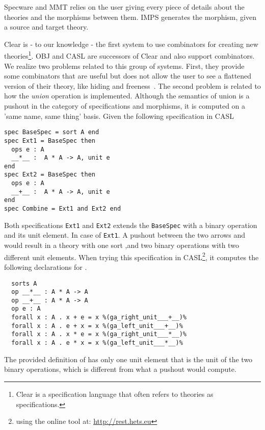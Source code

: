 
Specware and MMT relies on the user giving every piece of details about the theories and the morphisms between them. IMPS generates the morphism, given a source and target theory. 

Clear is - to our knowledge - the first system to use combinators for creating new theories\footnote{Clear is a specification language that often refers to theories as specifications.}. OBJ and CASL are successors of Clear and also support combinators. We realize two problems related to this group of systems. First, they provide some combinators that are useful but does not allow the user to see a flattened version of their theory, like hiding and freeness~\cite{CoFI:2004:CASL-RM}. The second problem is related to how the \emph{union} operation is implemented. Although the semantics of union is a pushout in the category of specifications and morphisms, it is computed on a 'same name, same thing' basis. Given the following specification in CASL 
\begin{lstlisting}
spec BaseSpec = sort A end 
spec Ext1 = BaseSpec then 
  ops e : A 
  __*__ :  A * A -> A, unit e 
end 
spec Ext2 = BaseSpec then 
  ops e : A 
  __+__ :  A * A -> A, unit e 
end 
spec Combine = Ext1 and Ext2 end
\end{lstlisting}
Both specifications \verb|Ext1| and \verb|Ext2| extends the \verb|BaseSpec| with a binary operation and its unit element. In case of \verb|Ext1|. A pushout between the two arrows  and  would result in a theory with one sort ,and  two binary operations with two different unit elements. When trying this specification in CASL\footnote{using the online tool at: \url{http://rest.hets.eu}}, it computes the following declarations for .  
\begin{lstlisting}
  sorts A
  op __*__ : A * A -> A
  op __+__ : A * A -> A
  op e : A
  forall x : A . x + e = x %(ga_right_unit___+__)%
  forall x : A . e + x = x %(ga_left_unit___+__)%
  forall x : A . x * e = x %(ga_right_unit___*__)%
  forall x : A . e * x = x %(ga_left_unit___*__)%
\end{lstlisting} 
The provided definition of  has only one unit element that is the unit of the two binary operations, which is different from what a pushout would compute. 

